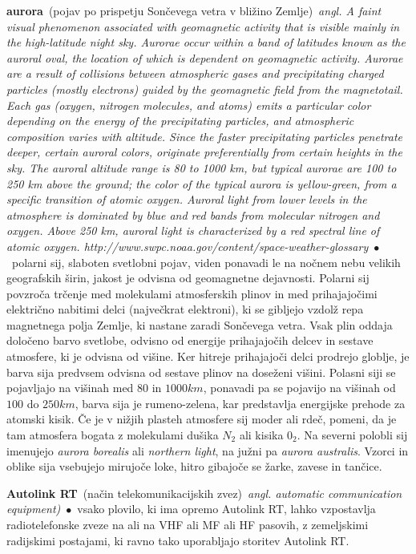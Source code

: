 \documentclass[10pt,a4paper,twoside]{article} %
\newcommand{\entry}[4]{\markboth{#1}{#1}\textbf{#1}\ {(#2)}\ \textit{#3}\ $\bullet$\ {#4}}  %
\begin{document}
\begin{multicols}{2}
\entry{aurora}{pojav po prispetju Sončevega vetra v bližino Zemlje}{angl. A faint visual phenomenon associated with geomagnetic activity that is visible mainly in the high-latitude night sky. Aurorae occur within a band of latitudes known as the auroral oval, the location of which is dependent on geomagnetic activity. Aurorae are a result of collisions between atmospheric gases and precipitating charged particles (mostly electrons) guided by the geomagnetic field from the magnetotail. Each gas (oxygen, nitrogen molecules, and atoms) emits a particular color depending on the energy of the precipitating particles, and atmospheric composition varies with altitude. Since the faster precipitating particles penetrate deeper, certain auroral colors, originate preferentially from certain heights in the sky. The auroral altitude range is 80 to 1000 km, but typical aurorae are 100 to 250 km above the ground; the color of the typical aurora is yellow-green, from a specific transition of atomic oxygen. Auroral light from lower levels in the atmosphere is dominated by blue and red bands from molecular nitrogen and oxygen. Above 250 km, auroral light is characterized by a red spectral line of atomic oxygen. {\scriptsize http://www.swpc.noaa.gov/content/space-weather-glossary}}{polarni sij, slaboten svetlobni pojav, viden ponavadi le na nočnem nebu velikih geografskih širin, jakost je odvisna od geomagnetne dejavnosti. Polarni sij povzroča trčenje med molekulami atmosferskih plinov in med prihajajočimi električno nabitimi delci (največkrat elektroni), ki se gibljejo vzdolž repa magnetnega polja Zemlje, ki nastane zaradi Sončevega vetra. Vsak plin oddaja določeno barvo svetlobe, odvisno od energije prihajajočih delcev in sestave atmosfere, ki je odvisna od višine. Ker hitreje prihajajoči delci prodrejo globlje, je barva sija predvsem odvisna od sestave plinov na doseženi višini. Polasni siji se pojavljajo na višinah med $ 80 $ in $ 1000 km $, ponavadi pa se pojavijo na višinah od $ 100 $ do $ 250 km $, barva sija je rumeno-zelena, kar predstavlja energijske prehode za atomski kisik. Če je v nižjih plasteh atmosfere sij moder ali rdeč, pomeni, da je tam atmosfera bogata z molekulami dušika $ N_2 $ ali kisika $ 0_2 $. Na severni polobli sij imenujejo \textit{aurora borealis} ali \textit{northern light}, na južni pa \textit{aurora australis}. Vzorci in oblike sija vsebujejo mirujoče loke, hitro gibajoče se žarke, zavese in tančice.}

\entry{Autolink RT}{način telekomunikacijskih zvez}{angl. automatic communication equipment)}{vsako plovilo, ki ima opremo Autolink RT, lahko vzpostavlja radiotelefonske zveze na ali na VHF ali MF ali HF pasovih, z zemeljskimi radijskimi postajami, ki ravno tako uporabljajo storitev Autolink RT.}



\end{multicols}
\end{document}
